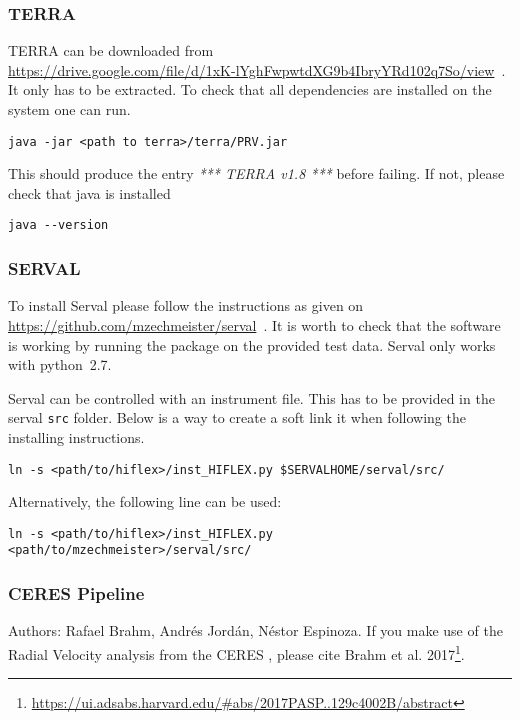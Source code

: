 \documentclass[10pt,a4paper]{article}
\begin{document}
\subsubsection{TERRA}
TERRA can be downloaded from\\ \url{https://drive.google.com/file/d/1xK-lYghFwpwtdXG9b4IbryYRd102q7So/view}~. It only has to be extracted. To check that all dependencies are installed on the system one can run.
\begin{lstlisting}[style=base]
java -jar <path to terra>/terra/PRV.jar
\end{lstlisting}
This should produce the entry \textit{*** TERRA v1.8 ***} before failing. If not, please check that java is installed
\begin{lstlisting}[style=base]
java --version
\end{lstlisting}

\subsubsection{SERVAL}
\label{Section:serval_package}
To install Serval please follow the instructions as given on\\ \url{https://github.com/mzechmeister/serval}~. It is worth to check that the software is working by running the package on the provided test data. Serval only works with python~2.7.

Serval can be controlled with an instrument file. This has to be provided in the serval \verb|src| folder. Below is a way to create a soft link it when following the installing instructions.
\begin{lstlisting}[style=base]
ln -s <path/to/hiflex>/inst_HIFLEX.py $SERVALHOME/serval/src/
\end{lstlisting}
Alternatively, the following line can be used:
\begin{lstlisting}[style=base]
ln -s <path/to/hiflex>/inst_HIFLEX.py <path/to/mzechmeister>/serval/src/
\end{lstlisting}


\subsubsection{CERES Pipeline}
\label{Section:Explanation_CERES_pipeline}
Authors: Rafael Brahm, Andr{\'e}s Jord{\'a}n, N{\'e}stor Espinoza. If you make use of the Radial Velocity analysis from the CERES , please cite Brahm et al. 2017\footnote{\url{https://ui.adsabs.harvard.edu/\#abs/2017PASP..129c4002B/abstract}}.
\end{document}
